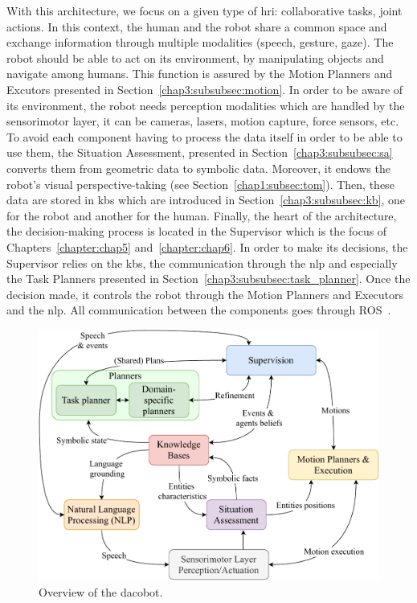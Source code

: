 \documentclass[a4paper,11pt,twoside]{StyleThese}
\begin{document}
With this architecture, we focus on a given type of \acrlong{hri}: collaborative tasks, joint actions. In this context, the human and the robot share a common space and exchange information through multiple modalities (speech, gesture, gaze). The robot should be able to act on its environment, by manipulating objects and navigate among humans. This function is assured by the Motion Planners and Excutors presented in Section~\ref{chap3:subsubsec:motion}. In order to be aware of its environment, the robot needs perception modalities which are handled by the sensorimotor layer, it can be cameras, lasers, motion capture, force sensors, etc. To avoid each component having to process the data itself in order to be able to use them, the Situation Assessment, presented in Section~\ref{chap3:subsubsec:sa} converts them from geometric data to symbolic data. Moreover, it endows the robot's visual perspective-taking (see Section~\ref{chap1:subsec:tom}). Then, these data are stored in \acrlong{kb}s which are introduced in Section~\ref{chap3:subsubsec:kb}, one for the robot and another for the human. Finally, the heart of the architecture, the decision-making process is located in the Supervisor which is the focus of Chapters~\ref{chapter:chap5} and~\ref{chapter:chap6}. In order to make its decisions, the Supervisor relies on the \acrshort{kb}s, the communication through the \acrfull{nlp} and especially the Task Planners presented in Section~\ref{chap3:subsubsec:task_planner}. Once the decision made, it controls the robot through the Motion Planners and Executors and the \acrshort{nlp}. All communication between the components goes through ROS~\cite{quigley_2009_ros}.

\begin{figure}[!ht]
	\includegraphics[width=\linewidth]{figures/chapter2/archi_overview.pdf}
	\caption{Overview of the \acrfull{dacobot}.}
	\label{chap3:fig:archi}
\end{figure}
\end{document}
